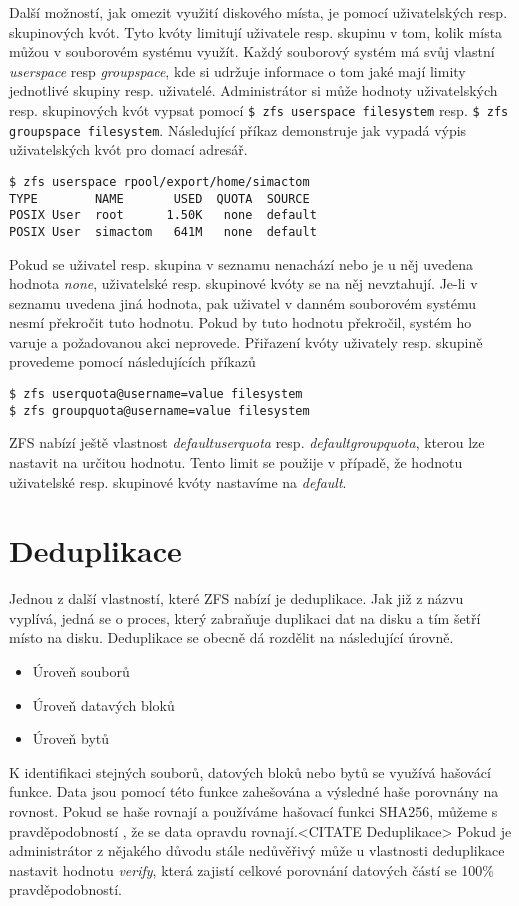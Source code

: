 Další možností, jak omezit využití diskového místa, je pomocí uživatelských resp. skupinových kvót. Tyto kvóty limitují uživatele resp. skupinu v tom, kolik místa můžou v souborovém systému využít. Každý souborový systém má svůj vlastní \emph{userspace} resp \emph{groupspace}, kde si udržuje informace o tom jaké mají limity jednotlivé skupiny resp. uživatelé.
Administrátor si může hodnoty uživatelských resp. skupinových kvót vypsat pomocí \verb|$ zfs userspace filesystem| resp. \verb|$ zfs groupspace filesystem|. Následující příkaz demonstruje jak vypadá výpis uživatelských kvót pro domací adresář.
\begin{verbatim}
$ zfs userspace rpool/export/home/simactom
TYPE        NAME       USED  QUOTA  SOURCE
POSIX User  root      1.50K   none  default
POSIX User  simactom   641M   none  default
\end{verbatim}

Pokud se uživatel resp. skupina v seznamu nenachází nebo je u něj uvedena hodnota \emph{none}, uživatelské resp. skupinové kvóty se na něj nevztahují. Je-li v seznamu uvedena jiná hodnota, pak uživatel v danném souborovém systému nesmí překročit tuto hodnotu. Pokud by tuto hodnotu překročil, systém ho varuje a požadovanou akci neprovede. Přiřazení kvóty uživately resp. skupině provedeme pomocí následujících příkazů
\begin{verbatim}
$ zfs userquota@username=value filesystem
$ zfs groupquota@username=value filesystem
\end{verbatim}

ZFS nabízí ještě vlastnost \emph{defaultuserquota} resp. \emph{defaultgroupquota}, kterou lze nastavit na určitou hodnotu. Tento limit se použije v případě, že hodnotu uživatelské resp. skupinové kvóty nastavíme na \emph{default}.
\section{Deduplikace}
\label{dedup}
Jednou z další vlastností, které ZFS nabízí je deduplikace. Jak již z názvu vyplívá, jedná se o proces, který zabraňuje duplikaci dat na disku a tím šetří místo na disku. Deduplikace se obecně dá rozdělit na následující úrovně.
\begin{itemize}
  \item Úroveň souborů
  \item Úroveň datavých bloků
  \item Úroveň bytů
\end{itemize}

K identifikaci stejných souborů, datových bloků nebo bytů se využívá hašovácí funkce. Data jsou pomocí této funkce zahešována a výsledné haše porovnány na rovnost. Pokud se haše rovnají a používáme hašovací funkci SHA256, můžeme s pravděpodobností , že se data opravdu rovnají.<CITATE Deduplikace> Pokud je administrátor z nějakého důvodu stále nedůvěřivý může u vlastnosti deduplikace nastavit hodnotu \emph{verify}, která zajistí celkové porovnání datových částí se 100\% pravděpodobností.

